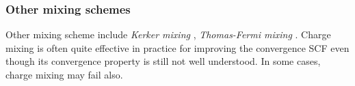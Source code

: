 \documentclass[11pt]{book}
\newcommand{\rhok}{\rho^{(k)}}
\begin{document}
%
%
\subsubsection{Other mixing schemes}
Other mixing scheme include {\em Kerker mixing} \cite{kerker},
{\em Thomas-Fermi mixing} \cite{tomfermi}. Charge mixing is often 
quite effective in practice for improving the convergence SCF even though 
its convergence property is still not well understood.  In some cases, 
charge mixing may fail also.
\end{document}
